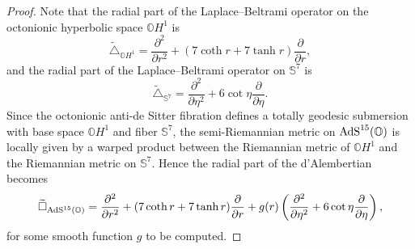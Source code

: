 \documentclass[pdftex]{sigma}
\numberwithin{equation}{section}
\begin{document}
\begin{proof}
Note that the radial part of the Laplace--Beltrami operator on the octonionic hyperbolic space $\mathbb{O}H^1$ is
\begin{equation*}%
\widetilde{\triangle}_{\mathbb{O}H^1}=\frac{{\partial}^2}{\partial {r}^2}+(7\coth r+7\tanh r)\frac{{\partial}}{\partial {r}},
\end{equation*}
and the radial part of the Laplace--Beltrami operator on $\mathbb{S}^{7}$ is
\begin{equation}\label{eq:LB_on_S^7}
\widetilde{\triangle}_{\mathbb{S}^7}=\frac{{\partial}^2}{\partial {\eta}^2}+6\cot \eta\frac{{\partial}}{\partial {\eta}}.
\end{equation}
Since the octonionic anti-de Sitter fibration defines a totally geodesic submersion with base space $\mathbb{O}H^1$ and fiber $\mathbb{S}^{7}$, the semi-Riemannian metric on ${\rm AdS}^{15}(\mathbb{O})$ is locally given by a warped product between the Riemannian metric of $\mathbb{O}H^1$ and the Riemannian metric on $\mathbb{S}^{7}$. Hence the radial part of the d'Alembertian becomes
\begin{equation}\label{radial 1}
\widetilde{\square}_{{\rm AdS}^{15}(\mathbb{O})}=\frac{{\partial}^2}{\partial {r}^2}+(7\coth r+7\tanh r)\frac{{\partial}}{\partial {r}} +g(r) \left(\frac{{\partial}^2}{\partial {\eta}^2}+6\cot \eta\frac{{\partial}}{\partial {\eta}} \right),
\end{equation}
for some smooth function $g$ to be computed.


\end{proof}
\end{document}

